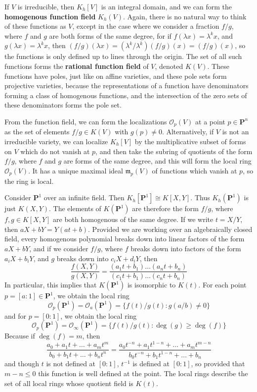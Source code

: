 If $V$ is irreducible, then $K_h[V]$ is an integral domain, and we can form the {\bf homogenous function field} $K_h(V)$. Again, there is no natural way to think of these functions as $V$, except in the case where we consider a fraction $f/g$, where $f$ and $g$ are both forms of the same degree, for if $f(\lambda x) = \lambda^k x$, and $g(\lambda x) = \lambda^k x$, then $(f/g)(\lambda x) = (\lambda^k/\lambda^k) (f/g)(x) = (f/g)(x)$, so the functions is only defined up to lines through the origin. The set of all such functions forms the {\bf rational function field} of $V$, denoted $K(V)$. These functions have poles, just like on affine varieties, and these pole sets form projective varieties, because the representations of a function have denominators forming a class of homogenous functions, and the intersection of the zero sets of these denominators forms the pole set.

From the function field, we can form the localizations $\mathcal{O}_p(V)$ at a point $p \in \mathbf{P}^n$ as the set of elements $f/g \in K(V)$ with $g(p) \neq 0$. Alternatively, if $V$ is not an irreducible variety, we can localize $K_h[V]$ by the multiplicative subset of forms on $V$ which do not vanish at $p$, and then take the subring of quotients of the form $f/g$, where $f$ and $g$ are forms of the same degree, and this will form the local ring $\mathcal{O}_p(V)$. It has a unique maximal ideal $\mathfrak{m}_p(V)$ of functions which vanish at $p$, so the ring is local.

\begin{example}
    Consider $\mathbf{P}^1$ over an infinite field. Then $K_h[\mathbf{P}^1] \cong K[X,Y]$. Thus $K_h(\mathbf{P}^1)$ is just $K(X,Y)$. The elements of $K(\mathbf{P}^1)$ are therefore the form $f/g$, where $f,g \in K[X,Y]$ are both homogenous of the same degree. If we write $t = X/Y$, then $aX + bY = Y(at + b)$. Provided we are working over an algebraically closed field, every homogenous polynomial breaks down into linear factors of the form $aX + bY$, and if we consider $f/g$, where $f$ breaks down into factors of the form $a_iX + b_iY$, and $g$ breaks down into $c_iX + d_iY$, then
    \[ \frac{f(X,Y)}{g(X,Y)} = \frac{(a_1t + b_1) \dots (a_nt + b_n)}{(c_1t + b_1) \dots (c_nt + b_n)} \]
    In particular, this implies that $K(\mathbf{P}^1)$ is isomorphic to $K(t)$. For each point $p = [a:1] \in \mathbf{P}^1$, we obtain the local ring
    \[ \mathcal{O}_p(\mathbf{P}^1) = \mathcal{O}_a(\mathbf{P}^1) = \{ f(t)/g(t) : g(a/b) \neq 0 \} \]
    and for $p = [0:1]$, we obtain the local ring
    \[ \mathcal{O}_p(\mathbf{P}^1) = \mathcal{O}_\infty(\mathbf{P}^1) = \{  f(t)/g(t) : \deg(g) \geq \deg(f) \} \]
    Because if $\deg(f) = m$, then
    \[ \frac{a_0 + a_1t + \dots + a_mt^m}{b_0 + b_1t + \dots + b_nt^n} = \frac{a_0t^{-n} + a_1t^{1-n} + \dots + a_mt^{m-n}}{b_0t^{-n} + b_1t^{1-n} + \dots + b_n} \]
    and though $t$ is not defined at $[0:1]$, $t^{-1}$ is defined at $[0:1]$, so provided that $m-n \leq 0$ this function is well defined at the point. The local rings describe the set of all local rings whose quotient field is $K(t)$.
\end{example}

